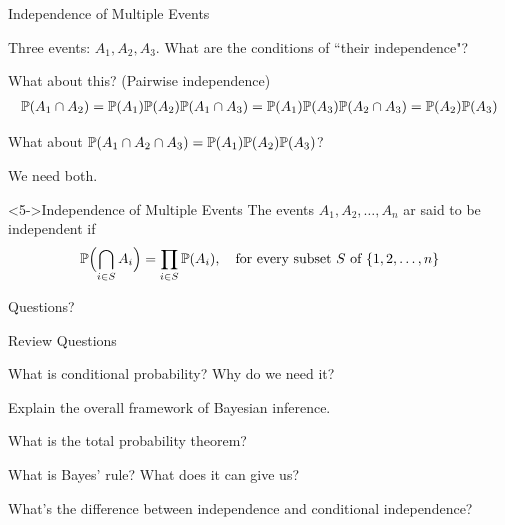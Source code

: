 \documentclass[handout,fleqn,aspectratio=169]{beamer}
\begin{document}
\begin{frame}{Independence of Multiple Events}

\plitemsep 0.1in
\bci 

\item<1-> Three events: $A_1, A_2, A_3.$ What are the conditions of ``their independence"?

\item<2-> What about this? (Pairwise independence)
\begin{align*}
\mathbb{P}( A_1 \cap A_2 ) = \mathbb{P}( A_1 ) \mathbb{P}( A_2 )
\mathbb{P}( A_1 \cap A_3 ) = \mathbb{P}( A_1 ) \mathbb{P}( A_3 )
\mathbb{P}( A_2 \cap A_3 ) = \mathbb{P}( A_2 ) \mathbb{P}( A_3 )
\end{align*}

\item<3-> What about $\mathbb{P}( A_1 \cap A_2 \cap A_3 ) = \mathbb{P}( A_1 ) \mathbb{P}( A_2 ) \mathbb{P}( A_3 )$?

\item<4-> We need both. 

\begin{block}<5->{Independence of Multiple Events}
The events $A_1,A_2, \ldots, A_n$ ar said to be independent if
$$
\mathbb{P}\Bigl( \bigcap_{i \in S} A_i \Bigr) = \prod_{i \in S} \mathbb{P}( A_i ), \quad \text{for every subset } S \text{ of } \{1,2, \ldots, n \}
$$
\end{block}
\eci 
\end{frame}


\begin{frame}{}
\vspace{2cm}
\LARGE Questions?

\end{frame}

\begin{frame}{Review Questions}
\bce[1)]
\item What is conditional probability? Why do we need it?

\item Explain the overall framework of Bayesian inference.

\item What is the total probability theorem?

\item What is Bayes' rule? What does it can give us?

\item What's the difference between independence and conditional independence?

\ece
\end{frame}
\end{document}
